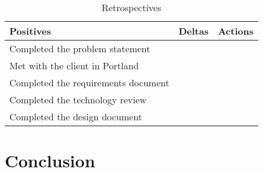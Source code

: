 \documentclass[journal,compsoc, 10pt, draftclsnofoot, onecolumn]{IEEEtran}
\begin{document}
\begin{table}[!h]
\centering
\caption{Retrospectives}
\label{my-label}
\begin{tabularx}{\textwidth}{X|X|X}
\hline
\textbf{Positives} & \textbf{Deltas} & \textbf{Actions} \\ \hline
Completed the problem statement                  &                 &                  \\ \hline
Met with the client in Portland                  &                 &                  \\ \hline
Completed the requirements document                  &                 &                  \\ \hline
Completed the technology review                 &                 &                  \\ \hline
Completed the design document                  &                 &                  \\ \hline
\end{tabularx}
\end{table}

\FloatBarrier
\section{Conclusion}
\end{document}
